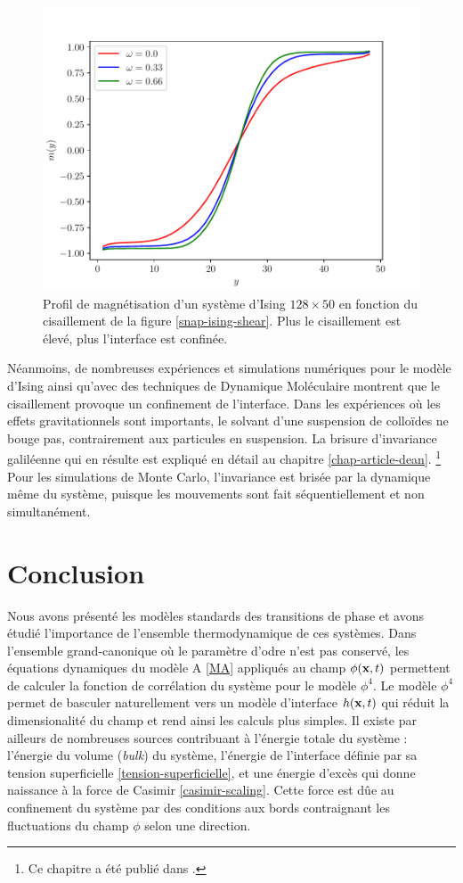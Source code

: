 \begin{figure}
    \centering
    \includegraphics[width=0.6\linewidth]{intro/profil-mag-ising-shear.pdf}
    \caption{Profil de magnétisation d'un système d'Ising $128 \times 50$ en fonction du cisaillement de la figure \ref{snap-ising-shear}. Plus le cisaillement est élevé, plus l'interface est confinée.}
    \label{profil-mag-ising-shear}
\end{figure}

Néanmoins, de nombreuses expériences\cite{derks_suppression_2006} et simulations numériques pour le modèle d'Ising \cite{leung_field_1986,rikvold_microstructure_2002,gonnella_nonequilibrium_2009,smith_driven_2010,smith_interfaces_2008,sadhu_non-local_2014,cohen_interface_2016,cirillo_monte_2005} ainsi qu'avec des techniques de Dynamique Moléculaire \cite{berthier_nonequilibrium_2002} montrent que le cisaillement provoque un confinement de l'interface. Dans les expériences où les effets gravitationnels sont importants, le solvant d'une suspension de colloïdes ne bouge pas, contrairement aux particules en suspension. La brisure d'invariance galiléenne qui en résulte est expliqué en détail au chapitre \ref{chap-article-dean}. \footnote{Ce chapitre a été publié dans \cite{dean_effect_2020}.}
Pour les simulations de Monte Carlo, l'invariance est brisée par la dynamique même du système, puisque les mouvements sont fait séquentiellement et non simultanément.

\section{Conclusion}

Nous avons présenté les modèles standards des transitions de phase et avons étudié l'importance de l'ensemble thermodynamique de ces systèmes.
Dans l'ensemble grand-canonique où le paramètre d'odre n'est pas conservé, les équations dynamiques du modèle A \ref{MA} appliqués au champ $\phi({\bf x},t)$ permettent de calculer la fonction de corrélation du système pour le modèle $\phi^4$. Le modèle $\phi^4$ permet de basculer naturellement vers un modèle d'interface $h({\bf x},t)$ qui réduit la dimensionalité du champ et rend ainsi les calculs plus simples.
Il existe par ailleurs de nombreuses sources contribuant à l'énergie totale du système : l'énergie du volume (\textit{bulk}) du système, l'énergie de l'interface définie par sa tension superficielle \ref{tension-superficielle}, et une énergie d'excès qui donne naissance à la force de Casimir \ref{casimir-scaling}. Cette force est dûe au confinement du système par des conditions aux bords contraignant les fluctuations du champ $\phi$ selon une direction. 

